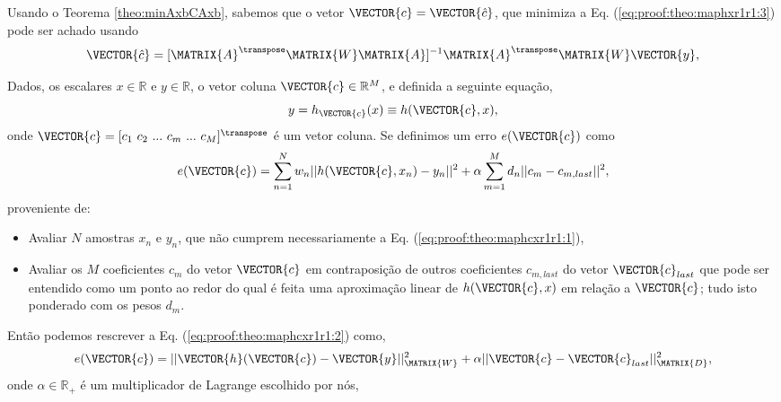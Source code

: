 \begin{myproofT}
Usando o Teorema \ref{theo:minAxbCAxb}, sabemos que o vetor $\VECTOR{c}=\VECTOR{\hat{c}}$,
que minimiza a Eq. (\ref{eq:proof:theo:maphxr1r1:3}) pode ser achado usando 
\begin{equation}\label{eq:proof:theo:maphxr1r1:5}
\VECTOR{\hat{c}}=[\MATRIX{A}^{\transpose}\MATRIX{W}\MATRIX{A}]^{-1}\MATRIX{A}^{\transpose}\MATRIX{W}\VECTOR{y},
\end{equation}
\end{myproofT}

\begin{myproofT}\label{proof:theo:maphcxr1r1}
Dados,
os escalares $x \in \mathbb{R}$ e $y \in \mathbb{R}$, o vetor coluna $\VECTOR{c} \in \mathbb{R}^M$, e 
definida a seguinte equação,
\begin{equation}\label{eq:proof:theo:maphcxr1r1:1}
y=h_{\VECTOR{c}}(x)\equiv h(\VECTOR{c},x),
\end{equation}
onde $\VECTOR{c}=[c_1~ c_2~ ...~ c_m~ ...~ c_M]^{\transpose}$ é um vetor coluna.
Se definimos um erro $e(\VECTOR{c})$ como
\begin{equation}\label{eq:proof:theo:maphcxr1r1:2}
e(\VECTOR{c}) =  \sum_{n=1}^{N} w_n||h(\VECTOR{c},x_n)-y_n||^2 + \alpha \sum_{m=1}^{M} d_n||c_m-c_{m,last}||^2,
\end{equation}
proveniente de:
\begin{itemize}
\item Avaliar $N$ amostras $x_n$ e $y_n$, que não cumprem necessariamente a Eq. (\ref{eq:proof:theo:maphcxr1r1:1}), 
\item Avaliar os $M$ coeficientes $c_m$ do vetor $\VECTOR{c}$ 
em contraposição de outros coeficientes $c_{m,last}$ do vetor $\VECTOR{c}_{last}$
que pode ser entendido como um ponto ao redor do qual é feita uma aproximação
linear de $h(\VECTOR{c},x)$ em relação a $\VECTOR{c}$; 
tudo isto ponderado com os pesos $d_m$.
\end{itemize}
Então podemos rescrever a Eq. (\ref{eq:proof:theo:maphcxr1r1:2}) como,
\begin{equation}\label{eq:proof:theo:maphcxr1r1:3}
e(\VECTOR{c}) =  ||\VECTOR{h}(\VECTOR{c})-\VECTOR{y}||_{\MATRIX{W}}^2 + \alpha||\VECTOR{c}-\VECTOR{c}_{last}||_{\MATRIX{D}}^2,
\end{equation}
onde $\alpha \in \mathbb{R}_+$ é um multiplicador de Lagrange escolhido por nós,
\begin{equation}

\end{equation}
\end{myproofT}
